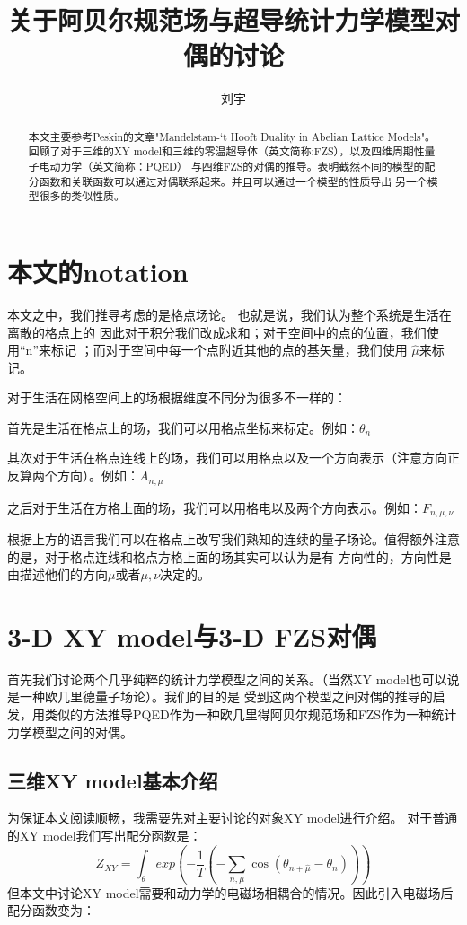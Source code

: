 \documentclass{article}
\begin{document}
\title{关于阿贝尔规范场与超导统计力学模型对偶的讨论}
\author{刘宇}

\maketitle


\begin{abstract}
    本文主要参考Peskin的文章"Mandelstam-‘t Hooft Duality in Abelian Lattice Models"。
    回顾了对于三维的XY model和三维的零温超导体（英文简称:FZS），以及四维周期性量子电动力学（英文简称：PQED）
    与四维FZS的对偶的推导。表明截然不同的模型的配分函数和关联函数可以通过对偶联系起来。并且可以通过一个模型的性质导出
    另一个模型很多的类似性质。
\end{abstract}

\tableofcontents
\newpage

\section{本文的notation}
本文之中，我们推导考虑的是格点场论。
也就是说，我们认为整个系统是生活在离散的格点上的
因此对于积分我们改成求和；对于空间中的点的位置，我们使用“n”来标记
；而对于空间中每一个点附近其他的点的基矢量，我们使用 $ \hat \mu$来标记。

对于生活在网格空间上的场根据维度不同分为很多不一样的：

首先是生活在格点上的场，我们可以用格点坐标来标定。例如：$\theta_n$

其次对于生活在格点连线上的场，我们可以用格点以及一个方向表示（注意方向正反算两个方向）。例如：$ A_{n,\mu}$

之后对于生活在方格上面的场，我们可以用格电以及两个方向表示。例如：$F_{n,\mu,\nu}$

根据上方的语言我们可以在格点上改写我们熟知的连续的量子场论。值得额外注意的是，对于格点连线和格点方格上面的场其实可以认为是有
方向性的，方向性是由描述他们的方向$\mu$或者$\mu,\nu$决定的。

\section{3-D XY model与3-D FZS对偶}

首先我们讨论两个几乎纯粹的统计力学模型之间的关系。（当然XY model也可以说是一种欧几里德量子场论）。我们的目的是
受到这两个模型之间对偶的推导的启发，用类似的方法推导PQED作为一种欧几里得阿贝尔规范场和FZS作为一种统计力学模型之间的对偶。




\subsection{三维XY model基本介绍}
为保证本文阅读顺畅，我需要先对主要讨论的对象XY model进行介绍。
对于普通的XY model我们写出配分函数是：
\begin{equation}
    Z_{XY} = \int_{\theta}  exp{ ( - \frac{1}{T} (- \sum_{n,\mu} \cos(\theta_{n+ \hat \mu} - \theta_n)) )}
\end{equation}
但本文中讨论XY model需要和动力学的电磁场相耦合的情况。因此引入电磁场后配分函数变为：
\end{document}
